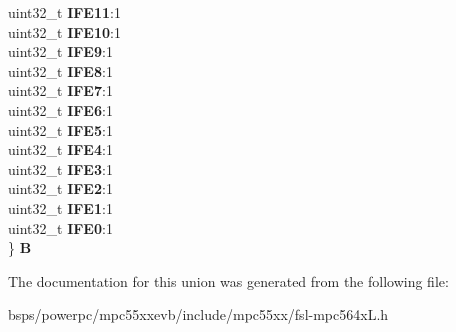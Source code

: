 \begin{DoxyCompactItemize}
\begin{tabbing}
\>uint32\_t {\bfseries IFE11}:1\\
\>uint32\_t {\bfseries IFE10}:1\\
\>uint32\_t {\bfseries IFE9}:1\\
\>uint32\_t {\bfseries IFE8}:1\\
\>uint32\_t {\bfseries IFE7}:1\\
\>uint32\_t {\bfseries IFE6}:1\\
\>uint32\_t {\bfseries IFE5}:1\\
\>uint32\_t {\bfseries IFE4}:1\\
\>uint32\_t {\bfseries IFE3}:1\\
\>uint32\_t {\bfseries IFE2}:1\\
\>uint32\_t {\bfseries IFE1}:1\\
\>uint32\_t {\bfseries IFE0}:1\\
\} {\bfseries B}\\

\end{tabbing}\end{DoxyCompactItemize}


The documentation for this union was generated from the following file\+:\begin{DoxyCompactItemize}
\item 
bsps/powerpc/mpc55xxevb/include/mpc55xx/fsl-\/mpc564x\+L.\+h\end{DoxyCompactItemize}
